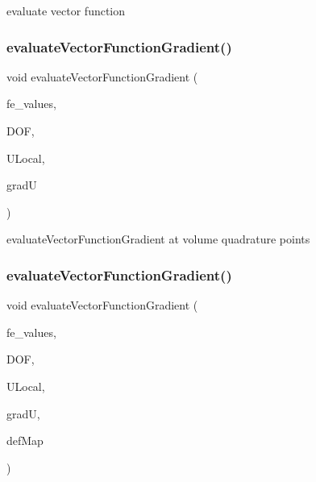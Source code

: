 evaluate vector function \mbox{\label{group___evaluation_functions_ga84eb2ee714466f113c96fcf6a9fd23e8}} 
\subsubsection{\texorpdfstring{evaluate\+Vector\+Function\+Gradient()}{evaluateVectorFunctionGradient()}\hspace{0.1cm}{\footnotesize\ttfamily [1/4]}}
{\footnotesize\ttfamily void evaluate\+Vector\+Function\+Gradient (\begin{DoxyParamCaption}\item[{const F\+E\+Values$<$ dim $>$ \&}]{fe\+\_\+values,  }\item[{unsigned int}]{D\+OF,  }\item[{Table$<$ 1, T $>$ \&}]{U\+Local,  }\item[{Table$<$ 3, T $>$ \&}]{gradU }\end{DoxyParamCaption})}

evaluate\+Vector\+Function\+Gradient at volume quadrature points \mbox{\label{group___evaluation_functions_ga5adf8aa2d91dbdf393aa91dcc65e42e8}} 
\subsubsection{\texorpdfstring{evaluate\+Vector\+Function\+Gradient()}{evaluateVectorFunctionGradient()}\hspace{0.1cm}{\footnotesize\ttfamily [2/4]}}
{\footnotesize\ttfamily void evaluate\+Vector\+Function\+Gradient (\begin{DoxyParamCaption}\item[{const F\+E\+Values$<$ dim $>$ \&}]{fe\+\_\+values,  }\item[{unsigned int}]{D\+OF,  }\item[{Table$<$ 1, T $>$ \&}]{U\+Local,  }\item[{Table$<$ 3, T $>$ \&}]{gradU,  }\item[{\mbox{\hyperlink{structdeformation_map}{deformation\+Map}}$<$ T, dim $>$ \&}]{def\+Map }\end{DoxyParamCaption})}


